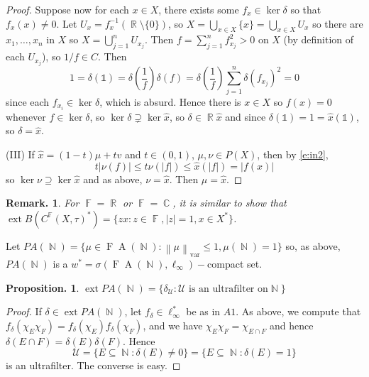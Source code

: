 \documentclass[11pt, a4paper]{memoir}
\DeclareMathOperator{\N}{{\mathbb{N}}}
\DeclareMathOperator{\R}{{\mathbb{R}}}
\DeclareMathOperator{\C}{{\mathbb{C}}}
\DeclareMathOperator{\F}{{\mathbb{F}}}
\newcommand{\norm}[1]{\ensuremath{\left\lVert#1\right\rVert}}
\theoremstyle{change}
\newtheorem{proposition}[theorem]{Proposition.}
\theoremstyle{plain}
\theoremstyle{nonumberplain}
\newtheorem{remark}{Remark.}
\newtheorem{proof}{Proof}
\DeclareMathOperator{\ext}{ext}
\newcommand{\idc}{\mathbb{1}}
\newcommand{\FA}{\ensuremath{\operatorname{F}\!\operatorname{A}}}
\numberwithin{equation}{section}
\begin{document}
\begin{proof}
    Suppose now for each $x\in X$, there exists some $f_x\in\ker\delta$ so that $f_x(x)\neq 0$.
    Let $U_x=f_x^{-1}(\R\setminus\{0\})$, so $X=\bigcup_{x\in X}\{x\}=\bigcup_{x\in X}U_x$ so there are $x_1,\ldots,x_n$ in $X$ so $X=\bigcup_{j=1}^n U_{x_j}$.
    Then $f=\sum_{j=1}^n f_{x_j}^2>0$ on $X$ (by definition of each $U_{x_j}$), so $1/f\in C$.
    Then
    \begin{equation*}
        1 = \delta(\idc)=\delta\left(\frac{1}{f}\right)\delta(f)=\delta\left(\frac{1}{f}\right)\sum_{j=1}^n\delta(f_{x_j})^2=0
    \end{equation*}
    since each $f_{x_i}\in\ker\delta$, which is absurd.
    Hence there is $x\in X$ so $f(x)=0$ whenever $f\in\ker\delta$, so $\ker\delta\supsetneq\ker\hat x$, so $\delta\in\R\hat x$ and since $\delta(\idc)=1=\hat x(\idc)$, so $\delta=\hat x$.

    (III) If $\hat x=(1-t)\mu+tv$ and $t\in(0,1)$, $\mu,\nu\in P(X)$, then by \cref{e:in2},
    \begin{equation*}
        t|\nu(f)|\leq t\nu(|f|)\leq\hat x(|f|)=|f(x)|
    \end{equation*}
    so $\ker\nu\supseteq\ker\hat x$ and as above, $\nu=\hat x$.
    Then $\mu=\hat x$.
\end{proof}
\begin{remark}
    For $\F=\R$ or $\F=\C$, it is similar to show that $\ext B(C^{\F}(X,\tau)^*)=\{z\hat x:z\in\F,|z|=1,x\in X^*\}$.
\end{remark}
Let $PA(\N)=\{\mu\in\FA(\N):\norm{\mu}_{\text{var}}\leq 1,\mu(\N)=1\}$ so, as above, $PA(\N)$ is a $w^*=\sigma(\FA(\N),\ell_\infty)-$compact set.
\begin{proposition}
    $\ext PA(\N)=\{\delta_{\mathcal{U}}:\mathcal{U}\text{ is an ultrafilter on}\N\}$
\end{proposition}
\begin{proof}
    If $\delta\in\ext PA(\N)$, let $f_\delta\in\ell_\infty^*$ be as in $A1$.
    As above, we compute that $f_\delta(\chi_E\chi_F)=f_\delta(\chi_E)f_\delta(\chi_F)$, and we have $\chi_E\chi_F=\chi_{E\cap F}$ and hence $\delta(E\cap F)=\delta(E)\delta(F)$.
    Hence
    \begin{equation*}
        \mathcal{U}=\{E\subseteq\N:\delta(E)\neq 0\}=\{E\subseteq\N:\delta(E)=1\}
    \end{equation*}
    is an ultrafilter.
    The converse is easy.
\end{proof}
\end{document}

